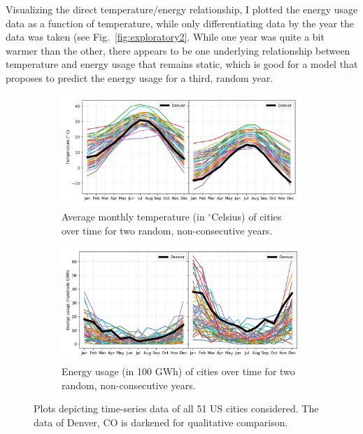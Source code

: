 \documentclass[11pt]{article}
\begin{document}
Visualizing the direct temperature/energy relationship, I plotted the energy usage data as a function of temperature, while only differentiating data by the year the data was taken (see Fig.~\ref{fig:exploratory2}. While one year was quite a bit warmer than the other, there appears to be one underlying relationship between temperature and energy usage that remains static, which is good for a model that proposes to predict the energy usage for a third, random year.

\begin{figure}[ht] \centering
  \begin{subfigure}{0.49\textwidth}
    \includegraphics[width=\textwidth]{exploratory1b.png}
    \caption{Average monthly temperature (in $^\circ$Celsius) of cities over time for two random, non-consecutive years.}
    \label{fig:temp_time}
  \end{subfigure}%
  \hfill
  \begin{subfigure}{0.49\textwidth}
    \includegraphics[width=\textwidth]{exploratory1a.png}
    \caption{Energy usage (in 100 GWh) of cities over time for two random, non-consecutive years.}
    \label{fig:energy_time}
  \end{subfigure}
  \caption{Plots depicting time-series data of all 51 US cities considered. The data of Denver, CO is darkened for qualitative comparison.}
  \label{fig:exploratory1}
\end{figure}
\end{document}
